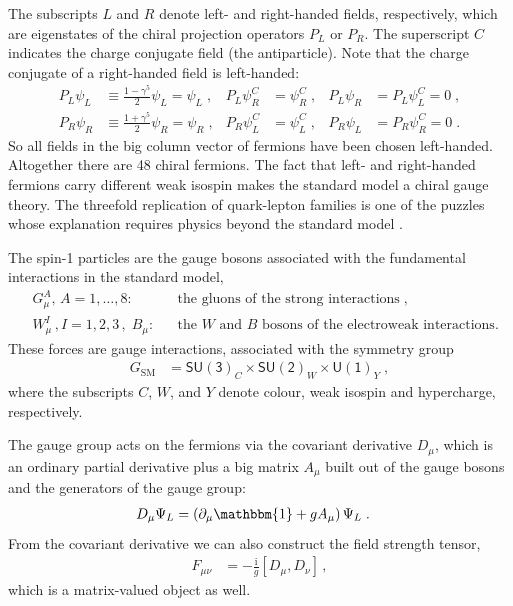 \documentclass[12pt]{report}
\newcommand{\ls}{{\ensuremath{\scriptscriptstyle L}}}
\newcommand{\rs}{{\ensuremath{\scriptscriptstyle R}}}
\newcommand{\cs}{{\ensuremath{\scriptscriptstyle C}}}
\renewcommand{\i}{\ensuremath{\text{i}}}
\newcommand{\2}{\ensuremath{\sqrt{2}\,}}
\begin{document}
    The subscripts $L$ and $R$ denote left- and right-handed fields, respectively,
    which are eigenstates of the chiral projection operators $P_L$ or $P_R$. The superscript $C$
    indicates the charge conjugate field (the antiparticle).  Note that the charge conjugate of a
    right-handed field is left-handed:
    \begin{align}
      P_L \psi_\ls&\equiv \frac{1-\gamma^5}{2} \psi_\ls = \psi_\ls\;, &
      P_L\psi_\rs^\cs &=\psi_\rs^\cs\;,  & P_L \psi_\rs &=  P_L\psi_\ls^\cs=0\;,\\
      P_R \psi_\rs&\equiv \frac{1+\gamma^5}{2} \psi_\rs = \psi_\rs\;, &
      P_R\psi_\ls^\cs &=\psi_\ls^\cs\;,   & P_R \psi_\ls &= P_R \psi_\rs^\cs=0\;.
    \end{align}
    So all fields in the big column vector of fermions have been chosen left-handed. Altogether there are 48
    chiral fermions. The fact that left- and right-handed fermions carry different
    weak isospin makes the standard model a chiral gauge theory. The threefold replication of
    quark-lepton families is one of the puzzles whose explanation requires physics beyond the
    standard model \cite{ellis}.

    The spin-1 particles are the gauge bosons associated with the fundamental interactions in the
    standard model, 
    \begin{align}
      &G_\mu^A, \, A=1,\dotsc,8: && \text{the gluons of the strong interactions}\;,\\
      &       W^I_\mu \,, I=1,2,3\,,\; B_\mu:
      && \text{the $W$ and $B$ bosons of the electroweak interactions.}
    \end{align}
    These forces are gauge interactions, associated with the symmetry group
    \begin{align}
      G_\text{SM}&=\mathsf{SU(3)}_C\times \mathsf{SU(2)}_W \times \mathsf{U(1)}_Y \; ,
    \end{align}
    where the subscripts $C$, $W$, and $Y$ denote colour, weak isospin and hypercharge, respectively.

    The gauge group acts on the fermions via the covariant derivative $D_\mu$, which is an ordinary
    partial derivative plus a big matrix $A_\mu$ built out of the gauge bosons and the generators of
    the gauge group:
    \begin{align}
      D_\mu \Psi_L &= \left(\partial_\mu \mathbbm{1} + g A_\mu \right)\Psi_L\;.
    \end{align}
    From the covariant derivative we can also construct the field strength tensor,
    \begin{align}
      F_{\mu\nu}&= -\frac{\i}{g} \left[ D_\mu, D_\nu\right]\, ,
    \end{align}
    which is a matrix-valued object as well.
\end{document}
